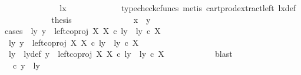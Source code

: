 \begin{isabellebody}
\ \ \ \ \ \ \ \ \isamarkupfalse%
\ \isamarkupfalse%
\ {\isachardoublequoteopen}{\isachardot}{\kern0pt}{\isachardot}{\kern0pt}{\isachardot}{\kern0pt}\ {\isacharequal}{\kern0pt}\ {\isasymlangle}lx{\isacharcomma}{\kern0pt}\ {\isasymt}{\isasymrangle}{\isachardoublequoteclose}\isanewline
\ \ \ \ \ \ \ \ \ \ \isamarkupfalse%
\ {\isacharparenleft}{\kern0pt}typecheck{\isacharunderscore}{\kern0pt}cfuncs{\isacharcomma}{\kern0pt}\ metis\ cart{\isacharunderscore}{\kern0pt}prod{\isacharunderscore}{\kern0pt}extract{\isacharunderscore}{\kern0pt}left\ lx{\isacharunderscore}{\kern0pt}def{\isacharparenright}{\kern0pt}\isanewline
\ \ \ \ \ \ \ \ \isamarkupfalse%
\ \isamarkupfalse%
\ {\isacharquery}{\kern0pt}thesis\isacommand{{\isachardot}{\kern0pt}}\isamarkupfalse%
\isanewline
\ \ \ \ \ \ \isamarkupfalse%
\isanewline
\ \ \ \ \ \ \isamarkupfalse%
\ {\isachardoublequoteopen}x\ {\isacharequal}{\kern0pt}\ y{\isachardoublequoteclose}\isanewline
\ \ \ \ \ \ \isamarkupfalse%
{\isacharparenleft}{\kern0pt}cases\ {\isachardoublequoteopen}{\isasymexists}\ ly{\isachardot}{\kern0pt}\ y\ {\isacharequal}{\kern0pt}\ left{\isacharunderscore}{\kern0pt}coproj\ X\ X\ {\isasymcirc}\isactrlsub c\ ly\ {\isasymand}\ ly\ {\isasymin}\isactrlsub c\ X{\isachardoublequoteclose}{\isacharparenright}{\kern0pt}\isanewline
\ \ \ \ \ \ \ \ \isamarkupfalse%
\ {\isachardoublequoteopen}{\isasymexists}ly{\isachardot}{\kern0pt}\ y\ {\isacharequal}{\kern0pt}\ left{\isacharunderscore}{\kern0pt}coproj\ X\ X\ {\isasymcirc}\isactrlsub c\ ly\ {\isasymand}\ ly\ {\isasymin}\isactrlsub c\ X{\isachardoublequoteclose}\isanewline
\ \ \ \ \ \ \ \ \isamarkupfalse%
\ \isamarkupfalse%
\ ly\ \ ly{\isacharunderscore}{\kern0pt}def{\isacharcolon}{\kern0pt}\ {\isachardoublequoteopen}y\ {\isacharequal}{\kern0pt}\ left{\isacharunderscore}{\kern0pt}coproj\ X\ X\ {\isasymcirc}\isactrlsub c\ ly\ {\isasymand}\ ly\ {\isasymin}\isactrlsub c\ X{\isachardoublequoteclose}\isanewline
\ \ \ \ \ \ \ \ \ \ \isamarkupfalse%
\ blast\isanewline
\ \ \ \ \ \ \ \ \isamarkupfalse%
\ {\isachardoublequoteopen}{\isasymrho}\ {\isasymcirc}\isactrlsub c\ y\ {\isacharequal}{\kern0pt}\ {\isasymlangle}ly{\isacharcomma}{\kern0pt}\ {\isasymt}{\isasymrangle}{\isachardoublequoteclose}\isanewline
\ \ \ \ \ \ \ \ \isamarkupfalse%
\ {\isacharminus}{\kern0pt}\ \isanewline
\ \ \ \ \ \ \ \ \ \ \isamarkupfalse%

\end{isabellebody}
